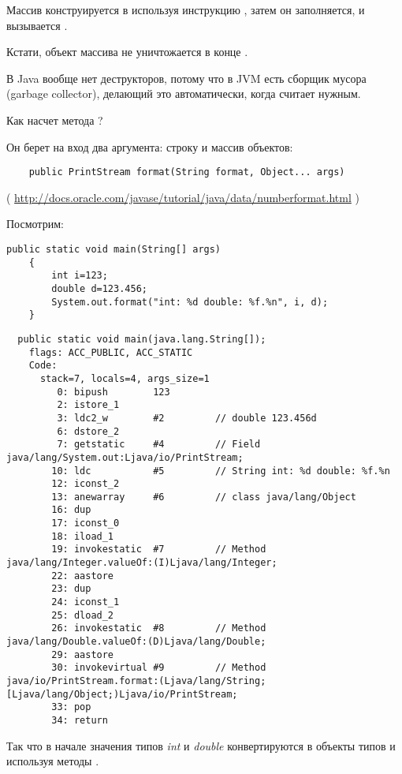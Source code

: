 Массив конструируется в \main используя инструкцию , 
затем он заполняется, и вызывается \ttf.


Кстати, объект массива не уничтожается в конце \main.

В Java вообще нет деструкторов, потому что в JVM есть сборщик мусора (garbage collector),
делающий это автоматически, когда считает нужным.


Как насчет метода ?

Он берет на вход два аргумента: строку и массив объектов:

\begin{lstlisting}
	public PrintStream format(String format, Object... args)
\end{lstlisting}
( \url{http://docs.oracle.com/javase/tutorial/java/data/numberformat.html} )

Посмотрим:

\begin{lstlisting}[style=customjava]
	public static void main(String[] args)
	{
		int i=123;
		double d=123.456;
		System.out.format("int: %d double: %f.%n", i, d);
	}
\end{lstlisting}

\begin{lstlisting}
  public static void main(java.lang.String[]);
    flags: ACC_PUBLIC, ACC_STATIC
    Code:
      stack=7, locals=4, args_size=1
         0: bipush        123
         2: istore_1      
         3: ldc2_w        #2         // double 123.456d
         6: dstore_2      
         7: getstatic     #4         // Field java/lang/System.out:Ljava/io/PrintStream;
        10: ldc           #5         // String int: %d double: %f.%n
        12: iconst_2      
        13: anewarray     #6         // class java/lang/Object
        16: dup           
        17: iconst_0      
        18: iload_1       
        19: invokestatic  #7         // Method java/lang/Integer.valueOf:(I)Ljava/lang/Integer;
        22: aastore       
        23: dup           
        24: iconst_1      
        25: dload_2       
        26: invokestatic  #8         // Method java/lang/Double.valueOf:(D)Ljava/lang/Double;
        29: aastore       
        30: invokevirtual #9         // Method java/io/PrintStream.format:(Ljava/lang/String;[Ljava/lang/Object;)Ljava/io/PrintStream;
        33: pop           
        34: return        
\end{lstlisting}


Так что в начале значения типов \emph{int} и \emph{double} конвертируются в объекты типов 
 и  используя методы .

